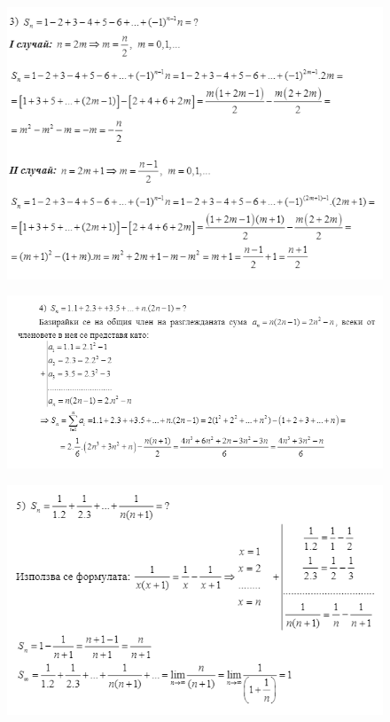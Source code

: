 \documentclass[fleqn, 12pt]{article}
\theoremstyle{definition}
\begin{document}
\begin{figure} [htp!]
\includegraphics{Pics/Discrete math/ex7/ex7-task6-4.png}
\end{figure}
\begin{figure} [htp!]
\includegraphics{Pics/Discrete math/ex7/ex7-task6-5.png}
\end{figure}
\begin{figure} [htp!]
\includegraphics{Pics/Discrete math/ex7/ex7-task6-6.png}
\end{figure}
\end{document}
